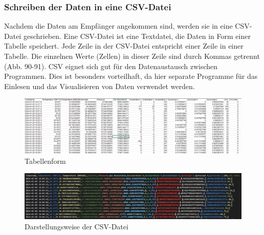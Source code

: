 \subsubsection{Schreiben der Daten in eine CSV-Datei}\label{csv}
Nachdem die Daten am Empfänger angekommen sind, werden sie in eine CSV-Datei geschrieben. Eine CSV-Datei ist eine Textdatei, die Daten in Form einer Tabelle speichert. Jede Zeile in der CSV-Datei entspricht einer Zeile in einer Tabelle. Die einzelnen Werte (Zellen) in dieser Zeile sind durch Kommas getrennt (Abb. 90-91).  CSV eignet sich gut für den Datenaustausch zwischen Programmen. Dies ist besonders vorteilhaft, da hier separate Programme für das Einlesen und  das Visualisieren von Daten verwendet werden.
\vspace{3mm}
\begin{figure}[H]
	\centering
	\includegraphics{image/tabellen.png}
	\caption{Tabellenform}
\end{figure}
\vspace{3mm}
\begin{figure}[H]
	\centering
	\includegraphics{image/darstellung.png}
	\caption{Darstellungsweise der CSV-Datei}
\end{figure}


